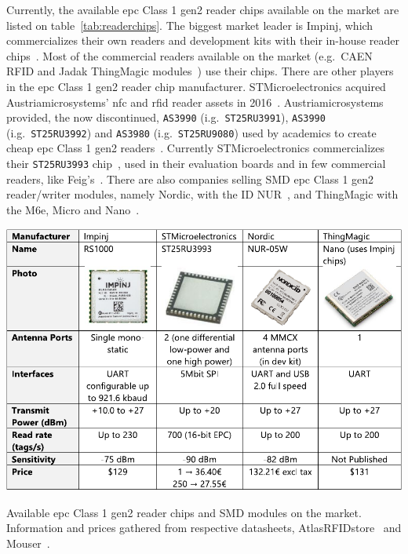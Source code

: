 Currently, the available \ac{epc} Class 1 \ac{gen2} reader chips available on the market are listed on table~\ref{tab:readerchips}.
The biggest market leader is Impinj, which commercializes their own readers and development kits with their in-house reader chips~\cite{RAINRFIDReader}. Most of the commercial readers available on the market (e.g.\ CAEN RFID and Jadak ThingMagic modules~\cite{RAINRFIDPartner}) use their chips.
There are other players in the \ac{epc} Class 1 \ac{gen2} reader chip manufacturer. 
STMicroelectronics acquired Austriamicrosystems' \ac{nfc} and \ac{rfid} reader assets in 2016~\cite{PressRelease}. Austriamicrosystems provided, the now discontinued, \texttt{AS3990} (i.g.\ \texttt{ST25RU3991}), \texttt{AS3990} (i.g.\ \texttt{ST25RU3992}) and \texttt{AS3980} (i.g.\ \texttt{ST25RU9080}) used by academics to create cheap \ac{epc} Class 1 \ac{gen2} readers~\cite{tangDesignUHFRFID2010a, leiDesignHandheldUHF2011, liDesignRadioFrequency2011}. Currently STMicroelectronics
commercializes their \texttt{ST25RU3993} chip~\cite{ST25RU3993}, used in their evaluation boards and in few commercial readers, like Feig's~\cite{UHFMidRange}.
There are also companies selling SMD \ac{epc} Class 1 \ac{gen2} reader/writer modules, namely Nordic, with the ID NUR~\cite{NURModulesNordic}, and ThingMagic with the M6e, Micro and Nano~\cite{ThingMagicRFID}.

\begin{table}
    \centering
    \includegraphics[width=\linewidth]{./figs/02-state-of-the-art/table_chipreaders.pdf}
    \caption[Available \ac{epc} Class 1 \ac{gen2} reader chips and SMD modules on the market]{Available \ac{epc} Class 1 \ac{gen2} reader chips and SMD modules on the market. Information and prices gathered from respective datasheets, AtlasRFIDstore~\cite{AtlasRFIDstoreBuyRFID} and Mouser~\cite{DistribuidorComponentesEletronicos}.}
    \label{tab:readerchips}
\end{table}

